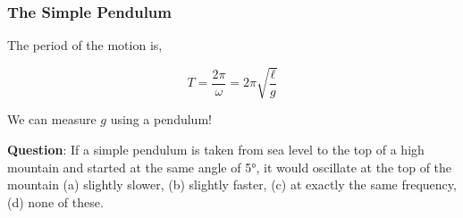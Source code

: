 \documentclass[]{beamer}
\begin{document}

\begin{frame}
\frametitle{The Simple Pendulum}

The period of the motion is,

\begin{equation}
T=\frac{2\pi}{\omega}=2\pi\sqrt{\frac{\ell}{g}}
\end{equation}
\pause

\vspace{3mm}
We can measure $g$ using a pendulum!
\vspace{3mm}

\pause
\textbf{Question}: If a simple pendulum is taken from sea level to the top of a high mountain
and started at the same angle of 5°, it would oscillate at the top of the mountain
(a) slightly slower, (b) slightly faster, (c) at exactly the same frequency, (d)  none of these.

\end{frame}


\end{document}
